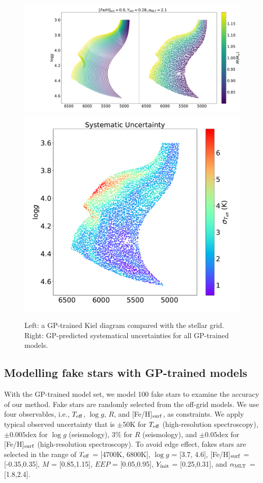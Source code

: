 \begin{figure}
	\includegraphics[width=1.3\columnwidth]{5d-au-mass.pdf}
	\includegraphics[width=0.7\columnwidth]{5d-au-mass-sys.pdf}
    \caption{ Left: a GP-trained Kiel diagram compared with the stellar grid. Right: GP-predicted systematical uncertainties for all GP-trained models.} 
  \label{fig:5d_augmentation}
\end{figure}

\subsection{Modelling fake stars with GP-trained models}

With the GP-trained model set, we model 100 fake stars to examine the accuracy of our method. Fake stars are randomly selected from the off-grid models. We use four observables, i.e., $T_{\rm eff}$, $\log g$, $R$, and [Fe/H]$_{\rm surf}$, as constraints. We apply typical observed uncertainty that is $\pm$50K for $T_{\rm eff}$ (high-resolution spectroscopy), $\pm0.005$dex for $\log g$ (seismology), $3\%$ for $R$ (seismology), and $\pm0.05$dex for [Fe/H]$_{\rm surf}$ (high-resolution spectroscopy). 
%
To avoid edge effect, fakes stars are selected in the range of $T_{\rm eff}$ = [4700K, 6800K], $\log g$ = [3.7, 4.6], [Fe/H]$_{\rm surf}$ = [-0.35,0.35], $M$ = [0.85,1.15], $EEP$ = [0.05,0.95], $Y_{\rm init}$ = [0.25,0.31], and $\alpha_{\rm MLT}$ = [1.8,2.4].  

